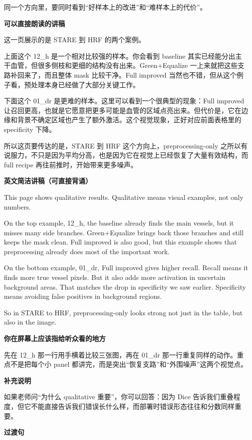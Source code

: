 \documentclass[12pt,a4paper]{ctexart}
\newcommand{\EnglishScriptHeading}{\textbf{\color{AccentGreen}英文简洁讲稿（可直接背诵）}}
\begin{document}
同一个方向里，要同时看到“好样本上的改进”和“难样本上的代价”。

\textbf{可以直接朗读的讲稿}

这一页展示的是 STARE 到 HRF 的两个案例。

上面这个 12\_h 是一个相对比较强的样本。你会看到 baseline 其实已经能分出主干血管，但很多侧枝和更细的结构没有出来。Green+Equalize 一上来就把这些支路补回来了，而且整体 mask 比较干净。Full improved 当然也不错，但从这个例子看，预处理本身已经做了大部分关键工作。

下面这个 01\_dr 是更难的样本。这里可以看到一个很典型的现象：Full improved 让召回更高，也就是它愿意把更多可能是血管的区域点亮出来。但代价是，它在边缘和背景不确定区域也产生了额外激活。这个视觉现象，正好对应前面表格里的 specificity 下降。

所以这页要传达的是，STARE 到 HRF 这个方向上，preprocessing-only 之所以有说服力，不只是因为平均分高，也是因为它在视觉上已经恢复了大量有效结构，而 full recipe 再往前推时，开始带来更多噪声。

\EnglishScriptHeading

This page shows qualitative results. Qualitative means visual examples, not only numbers.

On the top example, 12\_h, the baseline already finds the main vessels, but it misses many side branches. Green+Equalize brings back those branches and still keeps the mask clean. Full improved is also good, but this example shows that preprocessing already does most of the important work.

On the bottom example, 01\_dr, Full improved gives higher recall. Recall means it finds more true vessel pixels. But it also adds more activation in uncertain background areas. That matches the drop in specificity we saw earlier. Specificity means avoiding false positives in background regions.

So in STARE to HRF, preprocessing-only looks strong not just in the table, but also in the image.

\textbf{你在屏幕上应该指给听众看的地方}

先在 12\_h 那一行用手横着比较三张图，再在 01\_dr 那一行重复同样的动作。重点不是把每个小 panel 都讲完，而是突出“恢复支路”和“外围噪声”这两个视觉点。

\textbf{补充说明}

如果老师问“为什么 qualitative 重要”，你可以回答：因为 Dice 告诉我们重叠程度，但它不能直接告诉我们错误长什么样，而部署时错误形态往往和分数同样重要。

\textbf{过渡句}
\end{document}
